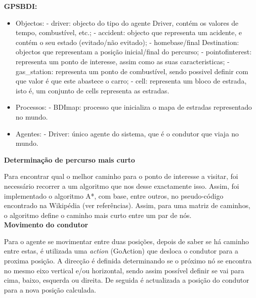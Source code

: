 \documentclass[15pt,a4paper]{article}
\begin{document}
\textbf{GPSBDI:}
\begin{itemize}
\item Objectos:
\subitem - driver: objecto do tipo do agente Driver, contém os valores de tempo, combustível, etc.;
\subitem - accident: objecto que representa um acidente, e contém o seu estado (evitado/não evitado);
\subitem - homebase/final Destination: objectos que representam a posição inicial/final do percurso;
\subitem - pointofinterest: representa um ponto de interesse, assim como as suas caracteristicas;
\subitem - gas\_station: representa um ponto de combustível, sendo possivel definir com que valor é que este abastece o carro;
\subitem - cell: representa um bloco de estrada, isto é, um conjunto de cells representa as estradas.
\item Processos:
\subitem - BDImap: processo que inicializa o mapa de estradas representado no mundo.
\item Agentes:
\subitem - Driver: único agente do sistema, que é o condutor que viaja no mundo.\\
\end{itemize}


\textbf{Determinação de percurso mais curto}

Para encontrar qual o melhor caminho para o ponto de interesse a visitar, foi necessário recorrer a um algoritmo que nos desse exactamente isso. Assim, foi implementado o algoritmo A*, com base, entre outros, no pseudo-código encontrado na Wikipédia (ver referências). Assim, para uma matriz de caminhos, o algoritmo define o caminho mais curto entre um par de nós.\\

\textbf{Movimento do condutor}

Para o agente se movimentar entre duas posições, depois de saber se há caminho entre estas, é utilizada uma \textit{action} (GoAction) que desloca o condutor para a proxima posição. A direcção é definida determinando se o próximo nó se encontra no mesmo eixo vertical e/ou horizontal, sendo assim possível definir se vai para cima, baixo, esquerda ou direita. De seguida é actualizada a posição do condutor para a nova posição calculada.\\
\end{document}
